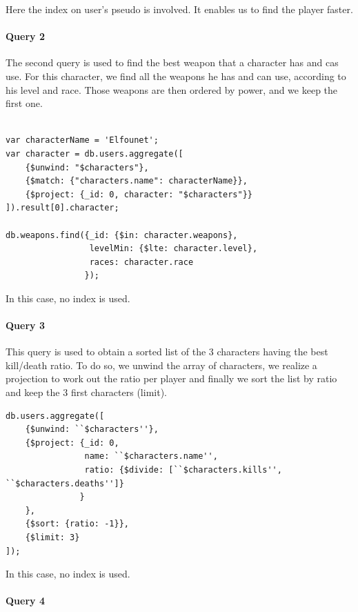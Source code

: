 \documentclass[a4paper, 11pt]{article}
\begin{document}
Here the index on user's pseudo is involved. It enables us to find the player faster.

\paragraph*{Query 2\\}
The second query is used to find the best weapon that a character has and cas use. For this character, we find all the weapons he has and can use, according to his level and race. Those weapons are then ordered by power, and we keep the first one.
~\\
~\\
\begin{lstlisting}
var characterName = 'Elfounet';
var character = db.users.aggregate([
    {$unwind: "$characters"}, 
    {$match: {"characters.name": characterName}},
    {$project: {_id: 0, character: "$characters"}}
]).result[0].character;

db.weapons.find({_id: {$in: character.weapons}, 
                 levelMin: {$lte: character.level}, 
                 races: character.race
                });
\end{lstlisting}

In this case, no index is used.

\paragraph*{Query 3\\}
This query is used to obtain a sorted list of the 3 characters having the best kill/death ratio. To do so, we unwind the array of characters, we realize a projection to work out the ratio per player and finally we sort the list by ratio and keep the 3 first characters (limit).

\begin{lstlisting}
db.users.aggregate([
    {$unwind: ``$characters''}, 
    {$project: {_id: 0, 
                name: ``$characters.name'', 
                ratio: {$divide: [``$characters.kills'', ``$characters.deaths'']}
               }
    },
    {$sort: {ratio: -1}},
    {$limit: 3}
]);
\end{lstlisting}

In this case, no index is used.

\paragraph*{Query 4\\}
\end{document}
